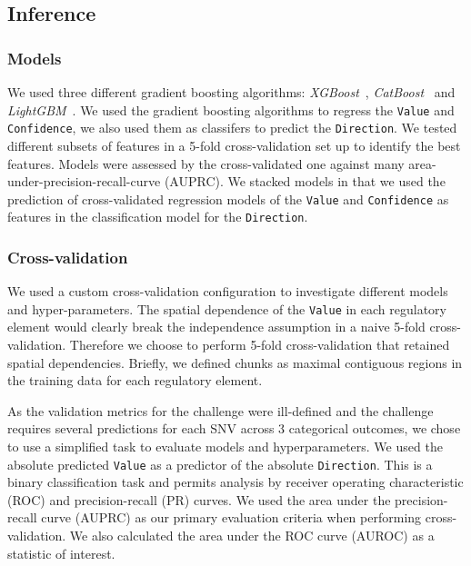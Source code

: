 \documentclass{article}
\begin{document}
\subsection*{Inference}


\subsubsection*{Models}

We used three different gradient boosting algorithms:
\emph{XGBoost}~\cite{ChenXGBoostScalableTree2016},
\emph{CatBoost}~\cite{ProkhorenkovaCatBoostunbiasedboosting2017} and
\emph{LightGBM}~\cite{KeLightGBMHighlyEfficient2017}. We used the gradient
boosting algorithms to regress the \texttt{Value} and \texttt{Confidence}, we
also used them as classifers to predict the \texttt{Direction}. We tested
different subsets of features in a 5-fold cross-validation set up to identify
the best features.  Models were assessed by the cross-validated one against
many area-under-precision-recall-curve (AUPRC). We stacked models in that we
used the prediction of cross-validated regression models of the \texttt{Value}
and \texttt{Confidence} as features in the classification model for the
\texttt{Direction}.


\subsubsection*{Cross-validation}

We used a custom cross-validation configuration to investigate different models
and hyper-parameters.  The spatial dependence of the \texttt{Value} in each
regulatory element would clearly break the independence assumption in a naive
5-fold cross-validation.  Therefore we choose to perform 5-fold
cross-validation that retained spatial dependencies. Briefly, we defined chunks
as maximal contiguous regions in the training data for each regulatory element.

As the validation metrics for the challenge were ill-defined and the challenge
requires several predictions for each SNV across 3 categorical outcomes, we
chose to use a simplified task to evaluate models and hyperparameters. We used
the absolute predicted \texttt{Value} as a predictor of the absolute
\texttt{Direction}.  This is a binary classification task and permits analysis
by receiver operating characteristic (ROC) and precision-recall (PR) curves. We
used the area under the precision-recall curve (AUPRC) as our primary
evaluation criteria when performing cross-validation. We also calculated the
area under the ROC curve (AUROC) as a statistic of interest.
\end{document}
